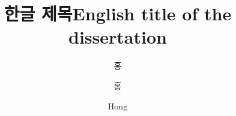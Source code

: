 \documentclass[doctor,english,final,pdfdoc]{kaist-ucs}
\title[korean] {한글 제목}
\title[english]{English title of the dissertation}
\author[korean]{홍}{길 동}
\author[korean2]{홍}{길동}    %
\author[chinese]{}{} %
\author[english]{Hong}{Gildong}
\begin{document}

		\thesisinfo
   
   

		

    \addtocounter{pagemarker}{1}                 %
    \newpage  
  
		\iffinal
			\tableofcontents

			\listoftables

			\listoffigures
		\else
			\label{paperlastromanpagelabel} %
		\fi

\end{document}
